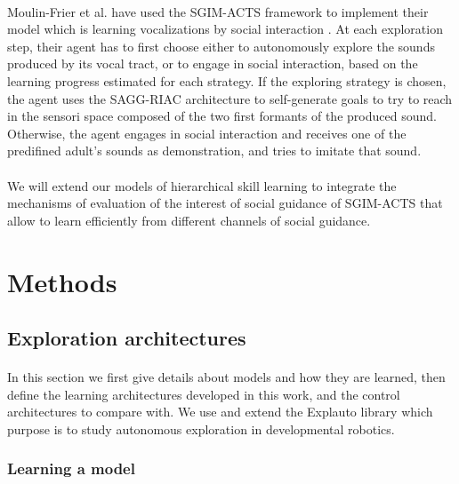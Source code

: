 \documentclass[12pt]{article}
\begin{document}
		\paragraph{}
		Moulin-Frier et al. have used the SGIM-ACTS framework to implement their model which is learning vocalizations by social interaction
		 \cite{moulin-frier_self-organization_2014}.
		At each exploration step, their agent has to first choose either to autonomously explore the sounds produced by its vocal tract, 
		or to engage in social interaction, based on the learning progress estimated for each strategy.
		If the exploring strategy is chosen, the agent uses the SAGG-RIAC architecture to self-generate goals to try to reach in the sensori space
		composed of the two first formants of the produced sound.
		Otherwise, the agent engages in social interaction and receives one of the predifined adult's sounds as demonstration, 
		and tries to imitate that sound.
				
		\paragraph{}
		We will extend our models of hierarchical skill learning to integrate the mechanisms of evaluation of the interest of social guidance of SGIM-ACTS
		that allow to learn efficiently from different channels of social guidance.
		
	
%

\newpage

\section{Methods}

	\subsection{Exploration architectures}

		\paragraph{}
		In this section we first give details about models and how they are learned, then 
		define the learning architectures developed in this work, and the control architectures to compare with.
		We use and extend the Explauto library \cite{moulin-frier_explauto:_2014} which purpose is to study autonomous exploration in developmental robotics.
			
		\subsubsection{Learning a model}
		
\end{document}
